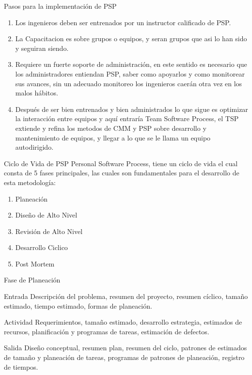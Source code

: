 \documentclass{beamer}
\begin{document}
			\begin{frame}{Pasos para la implementación de PSP}
				\begin{enumerate}
					\item Los ingenieros deben ser entrenados por un instructor calificado de PSP. \\ \smallskip \pause
					\item La Capacitacion es sobre grupos o equipos, y seran grupos que asi lo han sido y seguiran siendo. \\ \smallskip \pause
					\item Requiere un fuerte soporte de administración, en este sentido es necesario que los administradores entiendan PSP, saber como apoyarlos y como monitorear sus avances, sin un adecuado monitoreo los ingenieros caerán otra vez en los malos hábitos. \\ \smallskip \pause
					\item Después de ser bien entrenados y bien administrados lo que sigue es optimizar la interacción entre equipos y aquí entraría Team Software Process, el TSP extiende y refina los metodos de CMM y PSP sobre desarrollo y mantenimiento de equipos, y llegar a lo que se le llama un equipo autodirigido. \\ \smallskip
				\end{enumerate}
			\end{frame}
			
			\begin{frame}{Ciclo de Vida de PSP}
				Personal Software Process, tiene un ciclo de vida el cual consta de 5 fases principales, las cuales son fundamentales para el desarrollo de esta metodología: \\ \pause
				\begin{enumerate}		
					\item Planeación \pause
					\item Diseño de Alto Nivel \pause
					\item Revisión de Alto Nivel \pause
					\item Desarrollo Ciclico \pause
					\item Post Mortem
				\end{enumerate}
			\end{frame}											
				
			\begin{frame}{Fase de Planeación}
				\begin{block}{Entrada}
					Descripción del problema, resumen del proyecto, resumen cíclico, tamaño estimado, tiempo estimado, formas de planeación.
				\end{block}
				\begin{block}{Actividad}
					Requerimientos, tamaño estimado, desarrollo estrategia, estimados de recursos, planificación y programas de tareas, estimación de defectos.
				\end{block}
				\begin{block}{Salida}
					Diseño conceptual, resumen plan, resumen del ciclo, patrones de estimados de tamaño y planeación de tareas, programas de patrones de planeación, registro de tiempos.
				\end{block}
			\end{frame}
			
\end{document}
